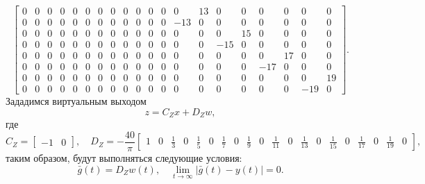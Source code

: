 \begin{equation*}
\begin{bmatrix}
        0  & 0  & 0  & 0  & 0  & 0  & 0  & 0  & 0  & 0  & 0  & 0  & 0  &13  & 0  & 0  & 0  & 0  & 0  & 0 \\
        0  & 0  & 0  & 0  & 0  & 0  & 0  & 0  & 0  & 0  & 0  & 0  &-13 & 0  & 0  & 0  & 0  & 0  & 0  & 0 \\
        0  & 0  & 0  & 0  & 0  & 0  & 0  & 0  & 0  & 0  & 0  & 0  & 0  & 0  & 0  &15  & 0  & 0  & 0  & 0 \\
        0  & 0  & 0  & 0  & 0  & 0  & 0  & 0  & 0  & 0  & 0  & 0  & 0  & 0  & -15& 0  & 0  & 0  & 0  & 0 \\
        0  & 0  & 0  & 0  & 0  & 0  & 0  & 0  & 0  & 0  & 0  & 0  & 0  & 0  & 0  & 0  & 0  &17  & 0  & 0 \\
        0  & 0  & 0  & 0  & 0  & 0  & 0  & 0  & 0  & 0  & 0  & 0  & 0  & 0  & 0  & 0  &-17 & 0  & 0  & 0 \\
        0  & 0  & 0  & 0  & 0  & 0  & 0  & 0  & 0  & 0  & 0  & 0  & 0  & 0  & 0  & 0  & 0  & 0  & 0  &19 \\
        0  & 0  & 0  & 0  & 0  & 0  & 0  & 0  & 0  & 0  & 0  & 0  & 0  & 0  & 0  & 0  & 0  & 0  &-19 & 0
    \end{bmatrix}.
\end{equation*}
Зададимся виртуальным выходом 
\begin{equation*}
    z=C_Zx+D_Zw,
\end{equation*}
где
\begin{equation*}
    C_Z=\begin{bmatrix}
        -1&0
    \end{bmatrix},\quad
    D_Z=-\frac{40}{\pi}\begin{bmatrix}
        1&0&\frac{1}{3}&0&\frac{1}{5}&0&\frac{1}{7}&0&\frac{1}{9}&0&\frac{1}{11}
        &0&\frac{1}{13}&0&\frac{1}{15}&0&\frac{1}{17}&0&\frac{1}{19}&0
    \end{bmatrix},
\end{equation*}
таким образом, будут выполняться следующие условия:
\begin{equation*}
    \bar g(t)=D_Zw(t),\quad \lim_{t\rightarrow\infty}|\bar g(t)-y(t)|=0.
\end{equation*}

